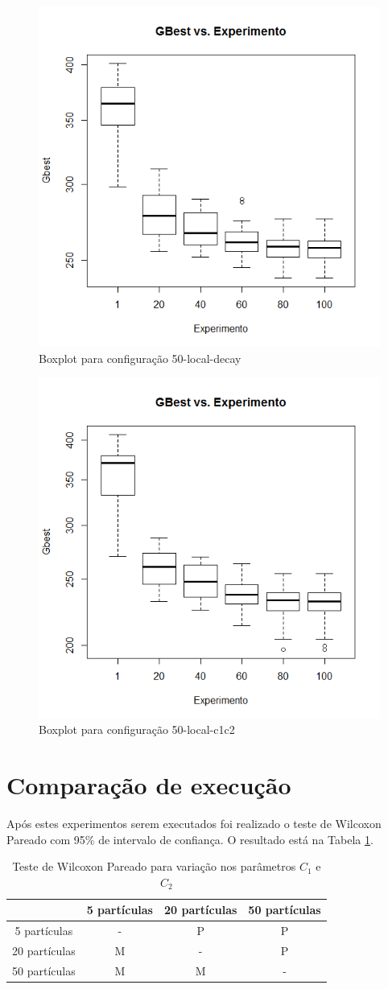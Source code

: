 \begin{figure}[H]
	\centering
	\includegraphics[width=.6\textwidth]{img/result_50_local_decay.png}
	\caption{Boxplot para configura\c{c}\~ao 50-local-decay}
	\label{fig:result_50_local_decay}
\end{figure}

\begin{figure}[H]
	\centering
	\includegraphics[width=.6\textwidth]{img/result_50_local_c1c2.png}
	\caption{Boxplot para configura\c{c}\~ao 50-local-c1c2}
	\label{fig:result_50_local_c1c2}
\end{figure}


\section{Compara\c{c}\~ao de execu\c{c}\~ao}
Ap\'os estes experimentos serem executados foi realizado o teste de Wilcoxon Pareado com 95\% de intervalo de confian\c{c}a. O resultado est\'a na Tabela \ref{tab:teste_wilcoxon}.
\begin{table}[H]
	\centering
	\caption{Teste de Wilcoxon Pareado para varia\c{c}\~ao nos par\^ametros $C_1$ e $C_2$}
	\begin{tabular}{|c|c|c|c|}
		\hline
		                    & 5 part\'iculas & 20 part\'iculas & 50 part\'iculas \\ \hline
		5 part\'iculas      & -              & P               & P \\
		20 part\'iculas     & M              & -               & P \\
		50 part\'iculas     & M              & M               & - \\
		\hline
	\end{tabular}
	\label{tab:teste_wilcoxon}
\end{table}